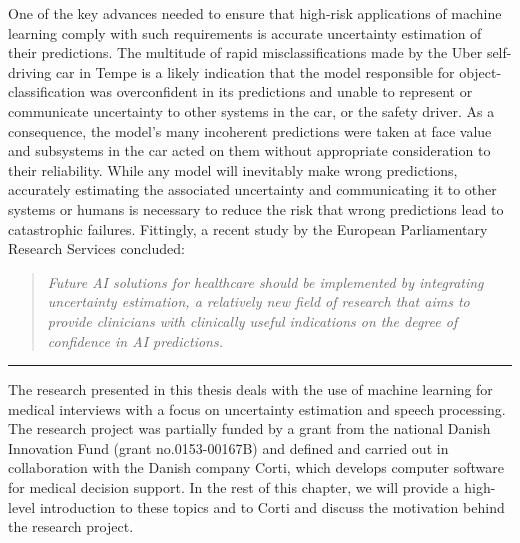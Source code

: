 One of the key advances needed to ensure that high-risk applications of machine learning comply with such requirements is accurate uncertainty estimation of their predictions. 
The multitude of rapid misclassifications made by the Uber self-driving car in Tempe is a likely indication that the model responsible for object-classification was overconfident in its predictions and unable to represent or communicate uncertainty to other systems in the car, or the safety driver. 
As a consequence, the model's many incoherent predictions were taken at face value and subsystems in the car acted on them without appropriate consideration to their reliability.
While any model will inevitably make wrong predictions, accurately estimating the associated uncertainty and communicating it to other systems or humans is necessary to reduce the risk that wrong predictions lead to catastrophic failures. 
Fittingly, a recent study by the European Parliamentary Research Services \parencite{europeanparliament_artificial_2022} concluded: 
%
\begin{quote}
    \centering\itshape
    Future AI solutions for healthcare should be implemented by integrating uncertainty estimation, a relatively new field of research that aims to provide clinicians with clinically useful indications on the degree of confidence in AI predictions.
\end{quote}
\begin{center}
\noindent\rule{0.2\textwidth}{0.5pt}
\end{center}
\vspace{1em}
%
%
\noindent The research presented in this thesis deals with the use of machine learning for medical interviews with a focus on uncertainty estimation and speech processing. 
The research project was partially funded by a grant from the national Danish Innovation Fund (grant no.\@ 0153-00167B) and defined and carried out in collaboration with the Danish company Corti, which develops computer software for medical decision support. 
In the rest of this chapter, we will provide a high-level introduction to these topics and to Corti and discuss the motivation behind the research project.


